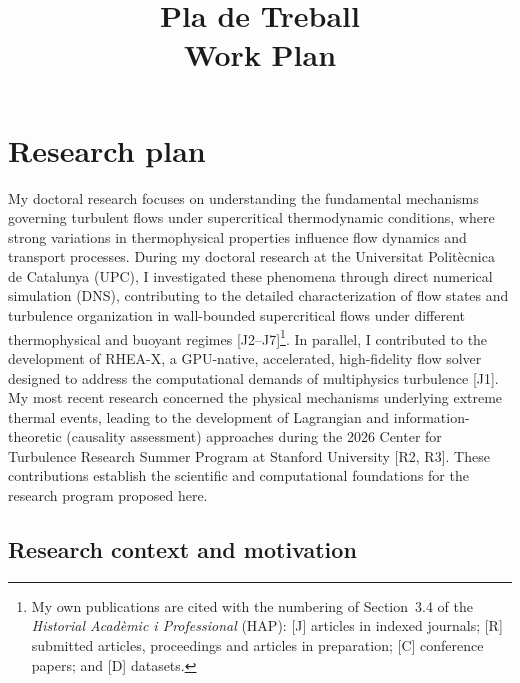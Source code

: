\documentclass[11pt]{article}
\title{\textbf{Pla de Treball}\\[2pt]\large Work Plan}
\author{\Large \CandName}
\date{}
\begin{document}
\maketitle
\thispagestyle{plain}
\vspace{0.5cm}
\begin{center}\postdata\end{center}

\newpage
\tableofcontents

\section{Research plan}\label{sec:research}

My doctoral research focuses on understanding the fundamental mechanisms governing turbulent flows under supercritical thermodynamic conditions, where strong variations in thermophysical properties influence flow dynamics and transport processes.
During my doctoral research at the Universitat Politècnica de Catalunya (UPC), I investigated these phenomena through direct numerical simulation (DNS), contributing to the detailed characterization of flow states and turbulence organization in wall-bounded supercritical flows under different thermophysical and buoyant regimes [J2--J7]\footnote{My own publications are cited with the numbering of Section~3.4 of the \textit{Historial Acadèmic i Professional} (HAP): [J] articles in indexed journals; [R] submitted articles, proceedings and articles in preparation; [C] conference papers; and [D] datasets.}.
In parallel, I contributed to the development of RHEA-X, a GPU-native, accelerated, high-fidelity flow solver designed to address the computational demands of multiphysics turbulence [J1].
My most recent research concerned the physical mechanisms underlying extreme thermal events, leading to the development of Lagrangian and information-theoretic (causality assessment) approaches during the 2026 Center for Turbulence Research Summer Program at Stanford University [R2, R3].
These contributions establish the scientific and computational foundations for the research program proposed here.

\subsection{Research context and motivation}\label{sec:background}
\end{document}
